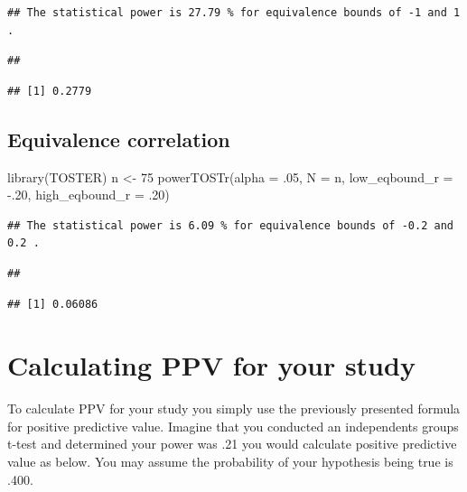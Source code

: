 \documentclass[
]{krantz}
\makeatletter
\newenvironment{Shaded}{\begin{snugshade}}{\end{snugshade}}
\newcommand{\AttributeTok}[1]{\textcolor[rgb]{0.61,0.61,0.61}{#1}}
\newcommand{\DecValTok}[1]{\textcolor[rgb]{0.06,0.06,0.06}{#1}}
\newcommand{\FunctionTok}[1]{\textcolor[rgb]{0,0,0}{#1}}
\newcommand{\NormalTok}[1]{#1}
\newcommand{\OtherTok}[1]{\textcolor[rgb]{0.37,0.37,0.37}{#1}}
\newcommand{\SpecialCharTok}[1]{\textcolor[rgb]{0,0,0}{#1}}
\newenvironment{kframe}{%
\medskip{}
\setlength{\fboxsep}{.8em}
 \def\at@end@of@kframe{}%
 \ifinner\ifhmode%
  \def\at@end@of@kframe{\end{minipage}}%
  \begin{minipage}{\columnwidth}%
 \fi\fi%
 \def\FrameCommand##1{\hskip\@totalleftmargin \hskip-\fboxsep
 \colorbox{shadecolor}{##1}\hskip-\fboxsep
     \hskip-\linewidth \hskip-\@totalleftmargin \hskip\columnwidth}%
 \MakeFramed {\advance\hsize-\width
   \@totalleftmargin\z@ \linewidth\hsize
   \@setminipage}}%
 {\par\unskip\endMakeFramed%
 \at@end@of@kframe}
\renewenvironment{Shaded}{\begin{kframe}}{\end{kframe}}
\makeatother
\begin{document}
\begin{verbatim}
## The statistical power is 27.79 % for equivalence bounds of -1 and 1 .
\end{verbatim}

\begin{verbatim}
## 
\end{verbatim}

\begin{verbatim}
## [1] 0.2779
\end{verbatim}

\hypertarget{equivalence-correlation-1}{%
\subsection{Equivalence correlation}\label{equivalence-correlation-1}}

\begin{Shaded}
\begin{Highlighting}[]
\FunctionTok{library}\NormalTok{(TOSTER)}
\NormalTok{n }\OtherTok{\textless{}{-}} \DecValTok{75}
\FunctionTok{powerTOSTr}\NormalTok{(}\AttributeTok{alpha =}\NormalTok{ .}\DecValTok{05}\NormalTok{,}
           \AttributeTok{N =}\NormalTok{ n,}
           \AttributeTok{low\_eqbound\_r =} \SpecialCharTok{{-}}\NormalTok{.}\DecValTok{20}\NormalTok{, }
           \AttributeTok{high\_eqbound\_r =}\NormalTok{ .}\DecValTok{20}\NormalTok{)}
\end{Highlighting}
\end{Shaded}

\begin{verbatim}
## The statistical power is 6.09 % for equivalence bounds of -0.2 and 0.2 .
\end{verbatim}

\begin{verbatim}
## 
\end{verbatim}

\begin{verbatim}
## [1] 0.06086
\end{verbatim}

\hypertarget{calculating-ppv-for-your-study}{%
\section{Calculating PPV for your study}\label{calculating-ppv-for-your-study}}

To calculate PPV for your study you simply use the previously presented formula for positive predictive value. Imagine that you conducted an independents groups t-test and determined your power was .21 you would calculate positive predictive value as below. You may assume the probability of your hypothesis being true is .400.
\end{document}
